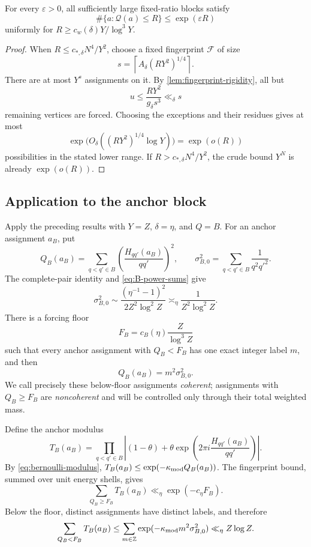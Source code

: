 \begin{proposition}
\label{prop:fingerprint-counting}
For every $\varepsilon>0$, all sufficiently large fixed-ratio blocks satisfy
\[
 \#\{a:\mathcal Q(a)\leq R\}\leq\exp(\varepsilon R)
\]
uniformly for $R\geq c_w(\delta)Y/\log^3Y$.
\end{proposition}
\begin{proof}
When $R\leq c_{*,\delta}N^4/Y^2$, choose a fixed fingerprint $\mathcal F$ of size
\[
 s=\left\lceil A_\delta(RY^2)^{1/4}\right\rceil.
\]
There are at most $Y^s$ assignments on it. By \cref{lem:fingerprint-rigidity}, all but
\[
 u\leq\frac{RY^2}{g_\delta s^3}\ll_\delta s
\]
remaining vertices are forced. Choosing the exceptions and their residues gives at most
\[
 \exp\bigl(O_\delta((RY^2)^{1/4}\log Y)\bigr)=\exp(o(R))
\]
possibilities in the stated lower range. If $R>c_{*,\delta}N^4/Y^2$, the crude bound $Y^N$ is already $\exp(o(R))$.
\end{proof}

\subsection{Application to the anchor block}

Apply the preceding results with $Y=Z$, $\delta=\eta$, and $Q=B$. For an anchor assignment $a_B$, put
\[
 Q_B(a_B)=\sum_{q<q'\in B}\left(\frac{H_{qq'}(a_B)}{qq'}\right)^2,
 \qquad
 \sigma_{B,0}^2=\sum_{q<q'\in B}\frac1{q^2q'^2}.
\]
The complete-pair identity and \cref{eq:B-power-sums} give
\begin{equation}
\label{eq:anchor-square-scale}
 \sigma_{B,0}^2\sim\frac{(\eta^{-1}-1)^2}{2Z^2\log^2Z}\asymp_\eta\frac1{Z^2\log^2Z}.
\end{equation}
There is a forcing floor
\[
 F_B=c_B(\eta)\frac{Z}{\log^3Z}
\]
such that every anchor assignment with $Q_B<F_B$ has one exact integer label $m$, and then
\begin{equation}
\label{eq:anchor-exact-energy}
 Q_B(a_B)=m^2\sigma_{B,0}^2.
\end{equation}
We call precisely these below-floor assignments \emph{coherent}; assignments with $Q_B\geq F_B$ are \emph{noncoherent} and will be controlled only through their total weighted mass.

Define the anchor modulus
\[
 T_B(a_B)=\prod_{q<q'\in B}\left|(1-\theta)+\theta\exp\left(2\pi i\frac{H_{qq'}(a_B)}{qq'}\right)\right|.
\]
By \cref{eq:bernoulli-modulus}, $T_B(a_B)\leq\exp(-\kappa_{\rm mod}Q_B(a_B))$. The fingerprint bound, summed over unit energy shells, gives
\begin{equation}
\label{eq:noncoherent-anchor-tail}
 \sum_{Q_B\geq F_B}T_B(a_B)\ll_\eta\exp(-c_\eta F_B).
\end{equation}
Below the floor, distinct assignments have distinct labels, and therefore
\[
 \sum_{Q_B<F_B}T_B(a_B)\leq\sum_{m\in\mathbb Z}\exp(-\kappa_{\rm mod}m^2\sigma_{B,0}^2)\ll_\eta Z\log Z.
\]

